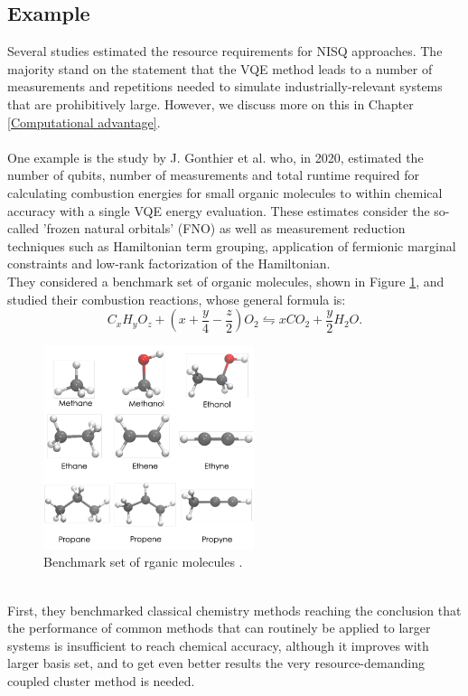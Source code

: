 \subsection{Example}
Several studies estimated the resource requirements for NISQ approaches. The majority stand on the statement that the VQE method leads to a number of measurements and repetitions needed to simulate industrially-relevant systems that are prohibitively large. However, we discuss more on this in Chapter \ref{Computational advantage}. \\
\\
One example is the study by J. Gonthier et al. \cite{Gonthier2020Dec} who, in 2020, estimated the number of qubits, number of measurements and total runtime required for calculating combustion energies for small organic molecules to within chemical accuracy with a single VQE energy evaluation. These estimates consider the so-called 'frozen natural orbitals' (FNO) as well as measurement reduction techniques such as Hamiltonian term grouping, application of fermionic marginal constraints and low-rank factorization of the Hamiltonian. \\
They considered a benchmark set of organic molecules, shown in Figure \ref{Organic molecules}, and studied their combustion reactions, whose general formula is:
\begin{equation}
    C_xH_yO_z + \left( x + \frac{y}{4} - \frac{z}{2} \right) O_2 \leftrightharpoons xCO_2 + \frac{y}{2}H_2O.
\end{equation}
\begin{figure}[ht]
  \centering
  \includegraphics[width=0.55\textwidth]{figures/Organic molecules.png}
  \caption{Benchmark set of rganic molecules \cite{Gonthier2020Dec}.} \label{Organic molecules}
\end{figure} \\
First, they benchmarked classical chemistry methods reaching the conclusion that the performance of common methods that can routinely be applied to larger systems is insufficient to reach chemical accuracy, although it improves with larger basis set, and to get even better results the very resource-demanding coupled cluster method is needed. \\
